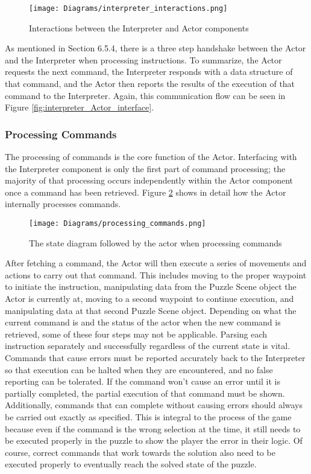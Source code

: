 \begin{figure}[!htb]
  \caption{Interactions between the Interpreter and Actor components}
  \label{fig:interpreter_interactions}
  \centering
  \texttt{[image: Diagrams/interpreter\_interactions.png]}
\end{figure}

As mentioned in Section 6.5.4, there is a three step handshake between the Actor and the Interpreter when processing instructions. To summarize, the Actor requests the next command, the Interpreter responds with a data structure of that command, and the Actor then reports the results of the execution of that command to the Interpreter. Again, this communication flow can be seen in Figure \ref{fig:interpreter_Actor_interface}. 

\subsubsection{Processing Commands}
The processing of commands is the core function of the Actor. Interfacing with the Interpreter component is only the first part of command processing; the majority of that processing occurs independently within the Actor component once a command has been retrieved. Figure \ref{fig:processing_commands} shows in detail how the Actor internally processes commands.\\

\begin{figure}[!htb]
  \caption{The state diagram followed by the actor when processing commands}
  \label{fig:processing_commands}
  \centering
  \texttt{[image: Diagrams/processing\_commands.png]}
\end{figure}

After fetching a command, the Actor will then execute a series of movements and actions to carry out that command. This includes moving to the proper waypoint to initiate the instruction, manipulating data from the Puzzle Scene object the Actor is currently at, moving to a second waypoint to continue execution, and manipulating data at that second Puzzle Scene object. Depending on what the current command is and the status of the actor when the new command is retrieved, some of these four steps may not be applicable. Parsing each instruction separately and successfully regardless of the current state is vital. Commands that cause errors must be reported accurately back to the Interpreter so that execution can be halted when they are encountered, and no false reporting can be tolerated. If the command won't cause an error until it is partially completed, the partial execution of that command must be shown. Additionally, commands that can complete without causing errors should always be carried out exactly as specified. This is integral to the process of the game because even if the command is the wrong selection at the time, it still needs to be executed properly in the puzzle to show the player the error in their logic. Of course, correct commands that work towards the solution also need to be executed properly to eventually reach the solved state of the puzzle.\\

